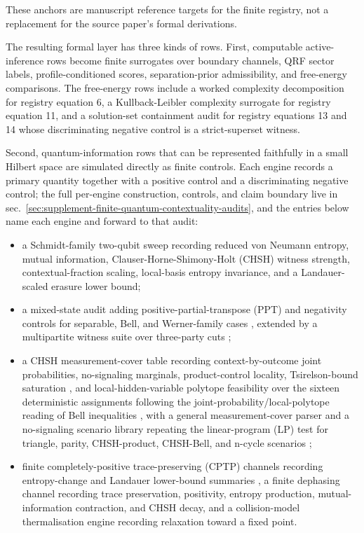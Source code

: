 \documentclass[
]{article}
\providecommand{\tightlist}{%
  \setlength{\itemsep}{0pt}\setlength{\parskip}{0pt}}
\begin{document}
These anchors are manuscript reference targets for the finite registry,
not a replacement for the source paper's formal derivations.

The resulting formal layer has three kinds of rows. First, computable
active-inference rows become finite surrogates over boundary channels,
QRF sector labels, profile-conditioned scores, separation-prior
admissibility, and free-energy comparisons. The free-energy rows include
a worked complexity decomposition for registry equation 6, a
Kullback-Leibler complexity surrogate for registry equation 11, and a
solution-set containment audit for registry equations 13 and 14 whose
discriminating negative control is a strict-superset witness.

Second, quantum-information rows that can be represented faithfully in a
small Hilbert space are simulated directly as finite controls. Each
engine records a primary quantity together with a positive control and a
discriminating negative control; the full per-engine construction,
controls, and claim boundary live in
sec.~\ref{sec:supplement-finite-quantum-contextuality-audits}, and the
entries below name each engine and forward to that audit:

\begin{itemize}
\tightlist
\item
  a Schmidt-family two-qubit sweep recording reduced von Neumann
  entropy, mutual information, Clauser-Horne-Shimony-Holt (CHSH) witness
  strength, contextual-fraction scaling, local-basis entropy invariance,
  and a Landauer-scaled erasure lower bound;
\item
  a mixed-state audit adding positive-partial-transpose (PPT) and
  negativity controls for separable, Bell, and Werner-family cases
  \citep{peres1996separability, horodecki1996separability, werner1989quantum},
  extended by a multipartite witness suite over three-party cuts
  \citep{greenberger1989going};
\item
  a CHSH measurement-cover table recording context-by-outcome joint
  probabilities, no-signaling marginals, product-control locality,
  Tsirelson-bound saturation \citep{cirelson1980quantum}, and
  local-hidden-variable polytope feasibility over the sixteen
  deterministic assignments following the
  joint-probability/local-polytope reading of Bell inequalities
  \citep{fine1982hidden}, with a general measurement-cover parser and a
  no-signaling scenario library repeating the linear-program (LP) test
  for triangle, parity, CHSH-product, CHSH-Bell, and n-cycle scenarios
  \citep{araujo2013ncycle};
\item
  finite completely-positive trace-preserving (CPTP) channels recording
  entropy-change and Landauer lower-bound summaries
  \citep{kraus1983states, nielsen2010quantum}, a finite dephasing
  channel recording trace preservation, positivity, entropy production,
  mutual-information contraction, and CHSH decay, and a collision-model
  thermalisation engine recording relaxation toward a fixed point.
\end{itemize}
\end{document}
